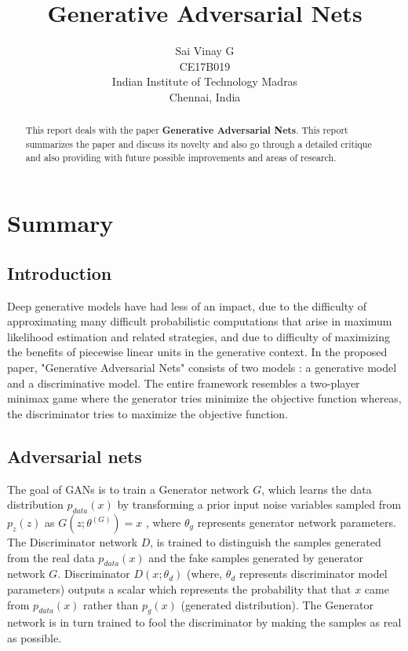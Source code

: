 \documentclass [11pt]{article}
\title{Generative Adversarial Nets}
\author{
Sai Vinay G \\
CE17B019 \\
Indian Institute of Technology Madras \\
Chennai, India \\
}
\begin{document}
\maketitle
\begin{abstract}
    This report deals with the paper \textbf{Generative Adversarial Nets}.
    This report summarizes the paper and discuss its novelty and also go through a detailed
    critique and also providing with future possible improvements and areas of research.
\end{abstract}

\section{Summary}

\vspace{0.5cm}

\subsection{Introduction}
\hspace{1cm}    Deep generative models have had less of an impact, due to the difficulty of approximating  many difficult probabilistic computations that arise in maximum likelihood estimation and related strategies, and due to difficulty of maximizing the benefits of piecewise linear units in the generative context. In the proposed paper, "Generative Adversarial Nets" consists of two models : a generative model and a discriminative model. The  entire framework resembles a two-player minimax game where
the generator tries minimize the objective function whereas, the discriminator tries to maximize the objective function.

\vspace{0.5cm}

\subsection{Adversarial nets}
\hspace{1cm}    The goal of GANs is to train a Generator network $G$, which learns the data distribution $p_{data}(x)$ by transforming a prior input noise variables sampled from $p_z(z)$ as  $ G(z;\theta^{(G)}) = x$ , where $\theta_g$ represents generator network parameters. The Discriminator network $D$, is trained to distinguish the samples generated from the real data  $p_{data}(x)$ and the fake samples generated by generator network $G$. Discriminator $D(x;\theta_d)$ (where, $\theta_d$ represents discriminator model parameters) outputs a scalar which represents the probability that that $x$ came from $p_{data}(x)$ rather than $p_{g}(x)$ (generated distribution). The Generator network is in turn trained to fool the discriminator by making the samples as real as possible.
\end{document}
